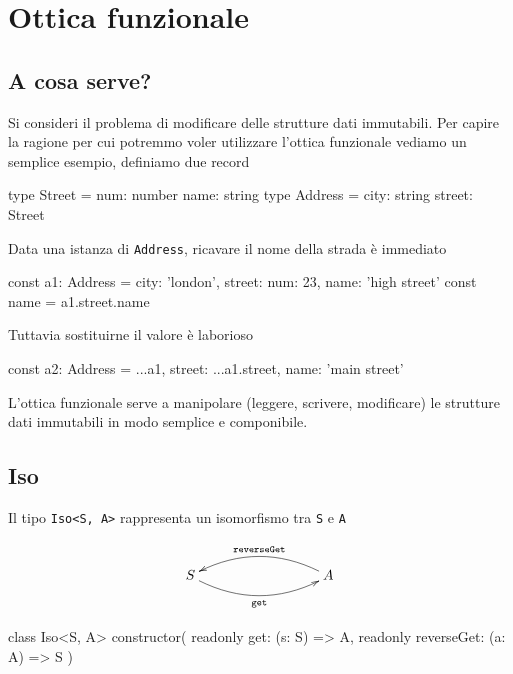 \documentclass[12pt]{article}
\theoremstyle{definition}
\newenvironment{code}
  {\vspace{0.5cm} \VerbatimEnvironment\begin{typescriptcode}}
  {\end{typescriptcode} \vspace{0.2cm}}
\begin{document}
\newpage

\section{Ottica funzionale}

\subsection{A cosa serve?}

Si consideri il problema di modificare delle strutture dati immutabili.
Per capire la ragione per cui potremmo voler utilizzare l'ottica funzionale vediamo un semplice esempio, definiamo due record

\begin{code}
type Street = {
  num: number
  name: string
}
type Address = {
  city: string
  street: Street
}
\end{code}

Data una istanza di \texttt{Address}, ricavare il nome della strada è immediato

\begin{code}
const a1: Address = {
  city: 'london',
  street: { num: 23, name: 'high street' }
}
const name = a1.street.name
\end{code}

Tuttavia sostituirne il valore è laborioso

\begin{code}
const a2: Address = {
  ...a1,
  street: {
    ...a1.street,
    name: 'main street'
  }
}
\end{code}

L'ottica funzionale serve a manipolare (leggere, scrivere, modificare) le strutture dati immutabili in modo semplice e componibile.

\subsection{Iso}

Il tipo \texttt{Iso<S, A>} rappresenta un isomorfismo tra \texttt{S} e \texttt{A}

\[
\xymatrixrowsep{3cm}
\xymatrixcolsep{3cm}
\xymatrix{
  S \ar@/_0.5cm/[r]_{\texttt{get}} & A \ar@/_0.5cm/[l]_{\texttt{reverseGet}}
}
\]

\begin{code}
class Iso<S, A> {
  constructor(
    readonly get: (s: S) => A,
    readonly reverseGet: (a: A) => S
  ) {}
}
\end{code}
\end{document}
